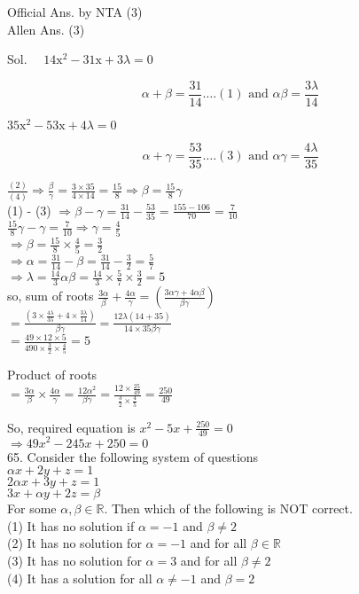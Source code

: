 \documentclass[10pt]{article}
\begin{document}
Official Ans. by NTA (3)\\
Allen Ans. (3)

Sol. \(\quad 14 \mathrm{x}^{2}-31 \mathrm{x}+3 \lambda=0\)

\[
\alpha+\beta=\frac{31}{14} \ldots .(1) \text { and } \alpha \beta=\frac{3 \lambda}{14}
\]

\(35 \mathrm{x}^{2}-53 \mathrm{x}+4 \lambda=0\)

\[
\alpha+\gamma=\frac{53}{35} \ldots .(3) \text { and } \alpha \gamma=\frac{4 \lambda}{35}
\]

\(\frac{(2)}{(4)} \Rightarrow \frac{\beta}{\gamma}=\frac{3 \times 35}{4 \times 14}=\frac{15}{8} \Rightarrow \beta=\frac{15}{8} \gamma\)\\
(1) - (3) \(\Rightarrow \beta-\gamma=\frac{31}{14}-\frac{53}{35}=\frac{155-106}{70}=\frac{7}{10}\)\\
\(\frac{15}{8} \gamma-\gamma=\frac{7}{10} \Rightarrow \gamma=\frac{4}{5}\)\\
\(\Rightarrow \beta=\frac{15}{8} \times \frac{4}{5}=\frac{3}{2}\)\\
\(\Rightarrow \alpha=\frac{31}{14}-\beta=\frac{31}{14}-\frac{3}{2}=\frac{5}{7}\)\\
\(\Rightarrow \lambda=\frac{14}{3} \alpha \beta=\frac{14}{3} \times \frac{5}{7} \times \frac{3}{2}=5\)\\
so, sum of roots \(\frac{3 \alpha}{\beta}+\frac{4 \alpha}{\gamma}=\left(\frac{3 \alpha \gamma+4 \alpha \beta}{\beta \gamma}\right)\)\\
\(=\frac{\left(3 \times \frac{4 \lambda}{35}+4 \times \frac{3 \lambda}{14}\right)}{\beta \gamma}=\frac{12 \lambda(14+35)}{14 \times 35 \beta \gamma}\)\\
\(=\frac{49 \times 12 \times 5}{490 \times \frac{3}{2} \times \frac{4}{5}}=5\)

Product of roots\\
\(=\frac{3 \alpha}{\beta} \times \frac{4 \alpha}{\gamma}=\frac{12 \alpha^{2}}{\beta \gamma}=\frac{12 \times \frac{25}{49}}{\frac{3}{2} \times \frac{4}{5}}=\frac{250}{49}\)

So, required equation is \(x^{2}-5 x+\frac{250}{49}=0\)\\
\(\Rightarrow 49 x^{2}-245 x+250=0\)\\
65. Consider the following system of questions\\
\(\alpha x+2 y+z=1\)\\
\(2 \alpha x+3 y+z=1\)\\
\(3 x+\alpha y+2 z=\beta\)\\
For some \(\alpha, \beta \in \mathbb{R}\). Then which of the following is NOT correct.\\
(1) It has no solution if \(\alpha=-1\) and \(\beta \neq 2\)\\
(2) It has no solution for \(\alpha=-1\) and for all \(\beta \in \mathbb{R}\)\\
(3) It has no solution for \(\alpha=3\) and for all \(\beta \neq 2\)\\
(4) It has a solution for all \(\alpha \neq-1\) and \(\beta=2\)
\end{document}
